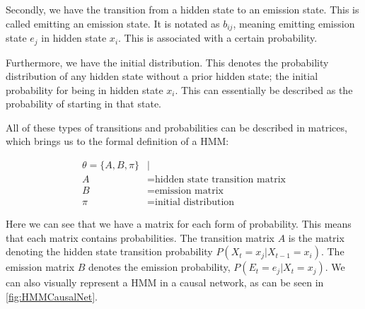 Secondly, we have the transition from a hidden state to an emission state. This is called emitting an emission state. It is notated as $b_{ij}$, meaning emitting emission state $e_j$ in hidden state $x_i$. This is associated with a certain probability.

Furthermore, we have the initial distribution. This denotes the probability distribution of any hidden state without a prior hidden state; the initial probability for being in hidden state $x_i$. This can essentially be described as the probability of starting in that state.

All of these types of transitions and probabilities can be described in matrices, which brings us to the formal definition of a HMM:

\begin{align*}
\theta = \{A,B,\pi\} &|\\
A &= \text{hidden state transition matrix}\\
B &= \text{emission matrix}\\
\pi &= \text{initial distribution}
\end{align*}

Here we can see that we have a matrix for each form of probability. This means that each matrix contains probabilities. The transition matrix $A$ is the matrix denoting the hidden state transition probability $P(X_t=x_j|X_{t-1}=x_i)$. The emission matrix $B$ denotes the emission probability, $P(E_t=e_j|X_t=x_j)$. We can also visually represent a HMM in a causal network, as can be seen in \cref{fig:HMMCausalNet}.

